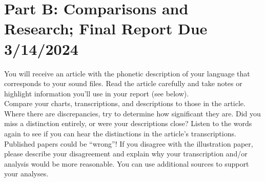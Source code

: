 \documentclass[12pt]{article}
\begin{document}
\section*{Part B: Comparisons and Research; Final Report Due 3/14/2024}
You will receive an article with the phonetic description of your language that corresponds to your sound files.  Read the article carefully and take notes or highlight information you’ll use in your report (see below).\\
Compare your charts, transcriptions, and descriptions to those in the article.  Where there are discrepancies, try to determine how significant they are.  Did you miss a distinction entirely, or were your descriptions close?  Listen to the words again to see if you can hear the distinctions in the article’s transcriptions.\\
Published papers could be “wrong”! If you disagree with the illustration paper, please describe your disagreement and explain why your transcription and/or analysis would be more reasonable. You can use additional sources to support your analyses.\\
\end{document}
